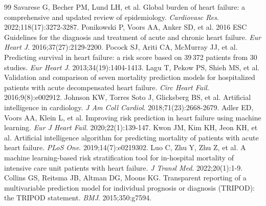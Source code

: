\documentclass[12pt,a4paper]{article}
\begin{document}

\begin{thebibliography}{99}
 Savarese G, Becher PM, Lund LH, et al. Global burden of heart failure: a comprehensive and updated review of epidemiology. \emph{Cardiovasc Res}. 2022;118(17):3272-3287.
 Ponikowski P, Voors AA, Anker SD, et al. 2016 ESC Guidelines for the diagnosis and treatment of acute and chronic heart failure. \emph{Eur Heart J}. 2016;37(27):2129-2200.
 Pocock SJ, Ariti CA, McMurray JJ, et al. Predicting survival in heart failure: a risk score based on 39 372 patients from 30 studies. \emph{Eur Heart J}. 2013;34(19):1404-1413.
 Lagu T, Pekow PS, Shieh MS, et al. Validation and comparison of seven mortality prediction models for hospitalized patients with acute decompensated heart failure. \emph{Circ Heart Fail}. 2016;9(8):e002912.
 Johnson KW, Torres Soto J, Glicksberg BS, et al. Artificial intelligence in cardiology. \emph{J Am Coll Cardiol}. 2018;71(23):2668-2679.
 Adler ED, Voors AA, Klein L, et al. Improving risk prediction in heart failure using machine learning. \emph{Eur J Heart Fail}. 2020;22(1):139-147.
 Kwon JM, Kim KH, Jeon KH, et al. Artificial intelligence algorithm for predicting mortality of patients with acute heart failure. \emph{PLoS One}. 2019;14(7):e0219302.
 Luo C, Zhu Y, Zhu Z, et al. A machine learning-based risk stratification tool for in-hospital mortality of intensive care unit patients with heart failure. \emph{J Transl Med}. 2022;20(1):1-9.
 Collins GS, Reitsma JB, Altman DG, Moons KG. Transparent reporting of a multivariable prediction model for individual prognosis or diagnosis (TRIPOD): the TRIPOD statement. \emph{BMJ}. 2015;350:g7594.
\end{thebibliography}
\end{document}
